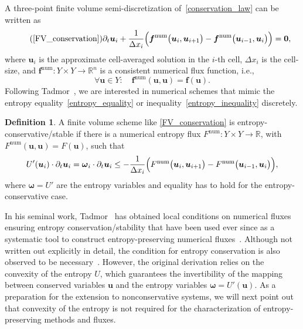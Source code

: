 \documentclass[]{scrartcl}
\renewcommand{\vec}[1]{\boldsymbol{#1}}
\theoremstyle{definition}
\newtheorem{definition}[theorem]{Definition}
\begin{document}
A three-point finite volume semi-discretization of~\eqref{conservation_law} can be written as
\begin{equation}
\tag{\ref{FV_conservation}}
	\partial_t \vec{u}_i + \frac{1}{\Delta x_i} \Bigl ( \vec{f}^{\mathrm{num}}\bigl( \vec{u}_{i}, \vec{u}_{i+1} \bigr)  - \vec{f}^{\mathrm{num}}\bigl( \vec{u}_{i-1}, \vec{u}_{i} \bigr) \Bigr ) = \vec{0},
\end{equation}
where $\vec{u}_i$ is the approximate cell-averaged solution in the $i$-th cell, $\Delta x_i$ is the cell-size, and $\vec{f}^{\mathrm{num}}\colon Y \times Y \to \mathbb{R}^n$ is a consistent numerical flux function, i.e.,
\begin{equation}
    \forall \vec{u} \in Y\colon \quad \vec{f}^{\mathrm{num}}(\vec{u},\vec{u}) = \vec{f}(\vec{u}).
\end{equation}
Following Tadmor~\cite{Tadmor1987,Tadmor2003}, we are interested in numerical schemes that mimic the entropy equality~\eqref{entropy_equality} or inequality~\eqref{entropy_inequality} discretely.

\begin{definition}\label{def_entropy_conservation}
A finite volume scheme like \eqref{FV_conservation} is entropy-conservative/stable if there is a numerical entropy flux $F^{\mathrm{num}}\colon Y \times Y \to \mathbb{R}$, with $F^{\mathrm{num}}(\vec{u},\vec{u}) = F(\vec{u})$, such that
\begin{equation}
	 U'(\vec{u}_i) \cdot \partial_t \vec{u}_i
     =
     \vec{\omega}_i \cdot \partial_t \vec{u}_i
     \leq
     - \frac{1}{\Delta x_i} \Bigl ( F^{\mathrm{num}}\bigl( \vec{u}_{i}, \vec{u}_{i+1} \bigr) - F^{\mathrm{num}}\bigl( \vec{u}_{i-1}, \vec{u}_{i} \bigr) \Bigr ),
\end{equation}
where $\vec{\omega} = U'$ are the entropy variables and equality has to hold for the entropy-conservative case.
\end{definition}

In his seminal work, Tadmor~\cite{Tadmor1987,Tadmor2003} has obtained local conditions on numerical fluxes ensuring entropy conservation/stability that have been used ever since as a systematic tool to construct entropy-preserving numerical fluxes~\cite{ismail2009affordable,ECChandra,Ranocha2018,thein2025computing,winters2020entropy,lefloch2021kinetic,artiano2025structurepreservinghighordermethodscompressible}.
Although not written out explicitly in detail, the condition for entropy conservation is also observed to be necessary~\cite[page~95]{Tadmor1987}.
However, the original derivation relies on the convexity of the entropy $U$, which guarantees the invertibility of the mapping between conserved variables $\vec{u}$ and the entropy variables $\vec{\omega} = U'(\vec{u})$.
As a preparation for the extension to nonconservative systems, we will next point out that convexity of the entropy is not required for the characterization of entropy-preserving methods and fluxes.
\end{document}
